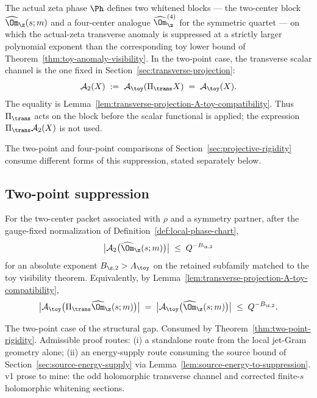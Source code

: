 The actual zeta phase \(\Ph\) defines two whitened blocks --- the
two-center block \(\widehat\Om_\z(s;m)\) and a four-center analogue
\(\widehat\Om_\z^{(4)}\) for the symmetric quartet --- on which the
actual-zeta transverse anomaly is suppressed at a strictly larger
polynomial exponent than the corresponding toy lower bound of
Theorem~\ref{thm:toy-anomaly-visibility}.  In the two-point case, the
transverse scalar channel is the one fixed in
Section~\ref{sec:transverse-projection}:
\[
        \mathcal A_2(X)
        \;:=\;\mathcal A_\toy(\Pi_\trans X)
        \;=\;\mathcal A_\toy(X).
\]
The equality is
Lemma~\ref{lem:transverse-projection-A-toy-compatibility}.  Thus
\(\Pi_\trans\) acts on the block before the scalar functional is
applied; the expression \(\Pi_\trans\mathcal A_2(X)\) is not used.

The two-point and four-point comparisons of
Section~\ref{sec:projective-rigidity} consume different forms of this
suppression, stated separately below.

\subsection{Two-point suppression}
\label{subsec:two-point-suppression}

\begin{hypothesis}
\label{hyp:zeta-suppression-two-point}
For the two-center packet associated with \(\rho\) and a symmetry
partner, after the gauge-fixed normalization of
Definition~\ref{def:local-phase-chart},
\begin{equation}
\label{eq:zeta-suppression-two-point-scalar}
        \bigl|\mathcal A_2\bigl(\widehat\Om_\z(s;m)\bigr)\bigr|
        \;\le\; Q^{-B_{\z,2}}
\end{equation}
for an absolute exponent \(B_{\z,2}>A_\toy\) on the retained
subfamily matched to the toy visibility theorem.  Equivalently, by
Lemma~\ref{lem:transverse-projection-A-toy-compatibility},
\[
        \bigl|\mathcal A_\toy\bigl(\Pi_\trans\widehat\Om_\z(s;m)\bigr)\bigr|
        \;=\;
        \bigl|\mathcal A_\toy\bigl(\widehat\Om_\z(s;m)\bigr)\bigr|
        \;\le\; Q^{-B_{\z,2}}.
\]
\end{hypothesis}

\begin{wip}\label{rem:wip-zeta-suppression-two-point}
The two-point case of the structural gap.  Consumed by
Theorem~\ref{thm:two-point-rigidity}.  Admissible proof routes:
\textup{(i)} a standalone route from the local jet-Gram geometry alone;
\textup{(ii)} an energy-supply route consuming the source bound
of Section~\ref{sec:source-energy-supply} via
Lemma~\ref{lem:source-energy-to-suppression}.  v1 prose to mine: the
odd holomorphic transverse channel and corrected finite-\(s\)
holomorphic whitening sections.
\end{wip}

